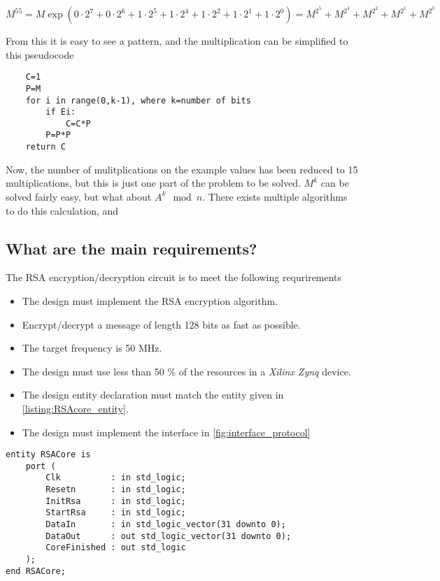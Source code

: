 \begin{equation}
    M^{55}=M\exp(0\cdot2^7 + 0\cdot2^6 + 1\cdot2^5 + 1\cdot2^4 + 1\cdot2^2 + 1\cdot2^1 + 1\cdot2^0) 
    = M^{2^5} + M^{2^4} + M^{2^2} + M^{2^1} + M^{2^0} 
\end{equation}

From this it is easy to see a pattern, and the multiplication can be simplified to this pseudocode
\begin{lstlisting}
    C=1
    P=M
    for i in range(0,k-1), where k=number of bits
        if Ei:
            C=C*P
        P=P*P
    return C
\end{lstlisting}

Now, the number of mulitplications on the example values has been reduced to 15 multiplications, but this is just one part of the problem to be solved. $M^k$ can be solved fairly easy, but what about $A^k \mod{n}$. There exists multiple algorithms to do this calculation, and
\subsection{What are the main requirements?}
The RSA encryption/decryption circuit is to meet the following requrirements 
\begin{itemize}
    \item The design must implement the RSA encryption algorithm.
    \item Encrypt/decrypt a message of length 128 bits as fast as possible.
    \item The target frequency is 50 MHz.
    \item The design must use less than 50 \% of the resources in a
        \emph{Xilinx Zynq} device.
    \item The design entity declaration must match the entity given in \cref{listing:RSAcore_entity}.
    \item The design must implement the interface in \cref{fig:interface_protocol}
\end{itemize}

\begin{lstlisting}
entity RSACore is
    port (
        Clk          : in std_logic;
        Resetn       : in std_logic;
        InitRsa      : in std_logic;
        StartRsa     : in std_logic;
        DataIn       : in std_logic_vector(31 downto 0);
        DataOut      : out std_logic_vector(31 downto 0);
        CoreFinished : out std_logic
    );
end RSACore;
\end{lstlisting}

